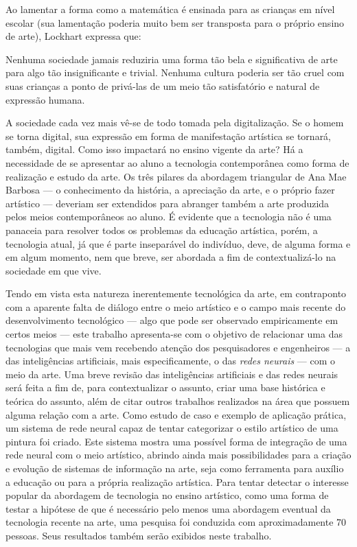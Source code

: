 \documentclass[12pt, a4paper]{article}
\begin{document}
Ao lamentar a forma como a matemática é ensinada para as crianças em nível escolar (sua lamentação poderia muito bem ser transposta para o próprio ensino de arte), Lockhart \cite{lockhart_lament} expressa que:

\begin{displayquote}
Nenhuma sociedade jamais reduziria uma forma tão bela e significativa de arte para algo tão insignificante e trivial. Nenhuma cultura poderia ser tão cruel com suas crianças a ponto de privá-las de um meio tão satisfatório e natural de expressão humana.
\end{displayquote}

A sociedade cada vez mais vê-se de todo tomada pela digitalização. Se o homem se torna digital, sua expressão em forma de 
manifestação artística se tornará, também, digital. Como isso impactará no ensino vigente da arte?
Há a necessidade de se apresentar ao aluno a tecnologia contemporânea como forma de realização e estudo da arte.
Os três pilares da abordagem triangular de Ana Mae Barbosa --- o conhecimento da história, a apreciação da arte, e o próprio fazer artístico ---
deveriam ser extendidos para abranger também a arte produzida pelos meios contemporâneos ao aluno.
É evidente que a tecnologia não é uma panaceia para resolver todos os problemas da educação artística, porém, a tecnologia atual, já que é parte
inseparável do indivíduo, deve, de alguma forma e em algum momento, nem que breve, ser abordada a fim de contextualizá-lo na sociedade em que vive.

Tendo em vista esta natureza inerentemente tecnológica da arte, em contraponto com a aparente falta de diálogo entre o meio artístico e o campo
mais recente do desenvolvimento tecnológico --- algo que pode ser observado empiricamente em certos meios --- este trabalho apresenta-se com o objetivo
de relacionar uma das tecnologias que mais vem recebendo atenção dos pesquisadores e engenheiros --- a das inteligências artificiais, mais especificamente,
o das \emph{redes neurais} --- com o meio da arte. 
Uma breve revisão das inteligências artificiais e das redes neurais será feita a fim de, para contextualizar o assunto, criar uma base 
histórica e teórica do assunto, além de citar outros trabalhos realizados na área que possuem alguma relação com a arte.
Como estudo de caso e exemplo de aplicação prática, um sistema de rede neural capaz de tentar categorizar o estilo artístico
de uma pintura foi criado. Este sistema mostra uma possível forma de integração de uma rede neural com o meio artístico, 
abrindo ainda mais possibilidades para a criação e evolução de sistemas de informação na arte, seja como ferramenta para auxílio a educação ou para a própria realização artística. 
Para tentar detectar o interesse popular da abordagem de tecnologia no ensino artístico, como uma forma de testar a hipótese de
que é necessário pelo menos uma abordagem eventual da tecnologia recente na arte, uma pesquisa foi conduzida com aproximadamente 70 pessoas. Seus resultados
também serão exibidos neste trabalho.
\end{document}
